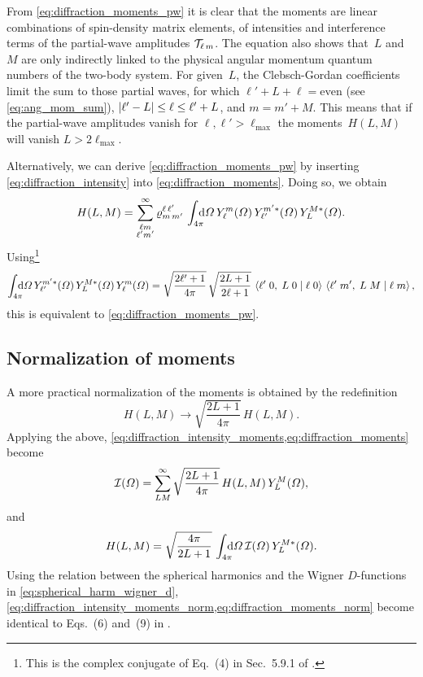 From \cref{eq:diffraction_moments_pw} it is clear that the moments are
linear combinations of spin-density matrix elements, \ie of
intensities and interference terms of the partial-wave amplitudes
$\mathcal{T}_{\ell\, m}$.  The equation also shows that~$L$ and~$M$
are only indirectly linked to the physical angular momentum quantum
numbers of the two-body system.  For given~$L$, the Clebsch-Gordan
coefficients limit the sum to those partial waves, for which $\ell' +
L + \ell = \text{even}$ (see \cref{eq:ang_mom_sum}), $\vert{\ell' - L}\vert
\leq \ell \leq \ell' + L$, and $m = m' + M$.  This means that if the
partial-wave amplitudes vanish for $\ell, \ell' > \ell_\text{max}$ the
moments~$H(L, M)$ will vanish $L > 2 \ell_\text{max}$.

Alternatively, we can derive \cref{eq:diffraction_moments_pw} by
inserting \cref{eq:diffraction_intensity} into
\cref{eq:diffraction_moments}.  Doing so, we obtain
\begin{equation}
  H(L, M)
  = \sum_{\substack{\ell m \\ \ell' m'}}^\infty
  \varrho^{\ell\, \ell'}_{m\, m'}\,
  \int_{4 \pi}\!\!\!\! \dif{\Omega}\,
  Y_\ell^m(\Omega)\,
  Y_{\ell'}^{m' *}(\Omega)\,
  Y_L^{M *}(\Omega).
\end{equation}
Using\footnote{This is the complex conjugate of Eq.~(4) in Sec.~5.9.1
of .}
\begin{equation}
  \label{eq:spherical_harm_clebsch}
  \int_{4 \pi}\!\!\!\! \dif{\Omega}\,
  Y_{\ell'}^{m' *}(\Omega)\, Y_L^{M *}(\Omega)\, Y_{\ell}^m(\Omega)
  = \sqrt{\frac{2 \ell' + 1}{4 \pi}}\, \sqrt{\frac{2 L + 1}{2 \ell + 1}}\, \clebsch{\ell'}{0}{L}{0}{\ell}{0}\, \clebsch{\ell'}{m'}{L}{M}{\ell}{m},
\end{equation}
this is equivalent to \cref{eq:diffraction_moments_pw}.


\subsection{Normalization of moments}%
\label{sec:diffraction:moments_norm}

A more practical normalization of the moments is obtained by the
redefinition
\begin{equation}
  H(L, M)
  \to \sqrt{\frac{2 L + 1}{4 \pi}}\, H(L, M).
\end{equation}
Applying the above,
\cref{eq:diffraction_intensity_moments,eq:diffraction_moments} become
\begin{equation}
  \label{eq:diffraction_intensity_moments_norm}
  \mathcal{I}(\Omega)
  = \sum_{L M}^\infty \sqrt{\frac{2 L + 1}{4 \pi}}\, H(L, M)\, Y_L^M(\Omega),
\end{equation}
and
\begin{equation}
  \label{eq:diffraction_moments_norm}
  H(L, M)
  = \sqrt{\frac{4 \pi}{2 L + 1}}\, \int_{4 \pi}\!\!\!\! \dif{\Omega}\, \intensity(\Omega)\, Y_L^{M *}(\Omega).
\end{equation}
Using the relation between the spherical harmonics and the Wigner
$D$-functions in \cref{eq:spherical_harm_wigner_d},
\cref{eq:diffraction_intensity_moments_norm,eq:diffraction_moments_norm}
become identical to Eqs.~(6) and~(9) in .

